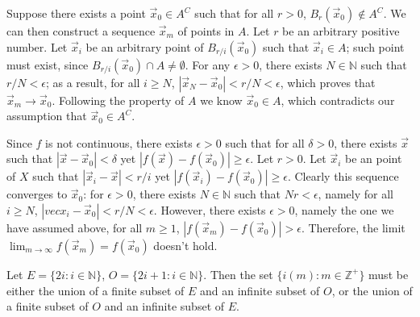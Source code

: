 \documentclass{homework}
\begin{document}
\begin{problem}{5}
Suppose there exists a point $\vec{x}_0 \in A^C$ such that for all $r > 0$, $B_r(\vec{x}_0) \notin A^C$. We can then construct a sequence $\vec{x}_m$ of points in $A$. Let $r$ be an arbitrary positive number. Let $\vec{x}_i$ be an arbitrary point of $B_{r/i}(\vec{x}_0)$ such that $\vec{x}_i \in A$; such point must exist, since $B_{r/i}(\vec{x}_0) \cap A \neq \emptyset$. For any $\epsilon > 0$, there exists $N \in \mathbb{N}$ such that $r/N < \epsilon$; as a result, for all $i \geq N$, $|\vec{x}_N - \vec{x}_0| < r/N < \epsilon$, which proves that $\vec{x}_m \to \vec{x}_0$. Following the property of $A$ we know $\vec{x}_0 \in A$, which contradicts our assumption that $\vec{x}_0 \in A^C$. \QED
\end{problem}

\begin{problem}{6}
Since $f$ is not continuous, there exists $\epsilon > 0$ such that for all $\delta > 0$, there exists $\vec{x}$ such that $|\vec{x} - \vec{x}_0| < \delta$ yet $|f(\vec{x}) - f(\vec{x}_0)| \geq \epsilon$. Let $r > 0$. Let $\vec{x}_i$ be an point of $X$ such that $|\vec{x}_i - \vec{x}| < r/i$ yet $|f(\vec{x}_i) - f(\vec{x}_0)| \geq \epsilon$. Clearly this sequence converges to $\vec{x}_0$: for $\epsilon > 0$, there exists $N \in \mathbb{N}$ such that $Nr < \epsilon$, namely for all $i \geq N$, $|vec{x}_i - \vec{x}_0| < r/N < \epsilon$. However, there exists $\epsilon > 0$, namely the one we have assumed above, for all $m \geq 1$, $|f(\vec{x}_m) - f(\vec{x}_0)| > \epsilon$. Therefore, the limit $\lim_{m \to \infty}f(\vec{x}_m) = f(\vec{x}_0)$ doesn't hold. \QED
\end{problem}

\begin{problem}{7}
Let $E = \{2i : i \in \mathbb{N}\}$, $O = \{2i + 1 : i \in \mathbb{N}\}$. Then the set $\{i(m) : m \in \mathbb{Z}^{+}\}$ must be either the union of a finite subset of $E$ and an infinite subset of $O$, or the union of a finite subset of $O$ and an infinite subset of $E$.
\end{problem}
\end{document}
